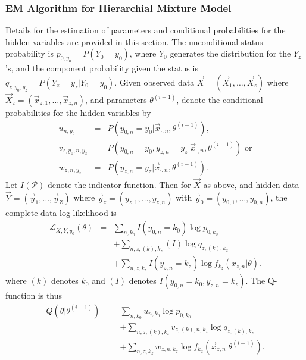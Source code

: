 \documentclass{bmcart}
\begin{document}
\begin{backmatter}
 \subsubsection*{EM Algorithm for Hierarchial Mixture Model}
Details for the estimation of parameters and conditional probabilities for the hidden variables are provided in this section. The unconditional status probability is $p_{0,y_0} = P(Y_0 = y_0)$, where $Y_0$ generates the distribution for the $Y_z$'s, and 
the component probability given the status is $q_{z,y_0,y_z} = P(Y_z = y_z | Y_0 = y_0)$.  Given observed data $\vec X = (\vec 
X_1, \ldots, \vec X_z)$ where $\vec X_z = (\vec x_{z,1}, \ldots, \vec x_{z,n})$, and parameters $\theta^{(i-1)}$, denote the 
conditional probabilities for the hidden variables by
\begin{equation}\label{eqn:weights_mdmixmod_defn}
	\begin{array}{rcl}
		u_{n,y_0} & = & P(y_{0,n} = y_0 | \vec x_{\cdot,n}, \theta^{(i-1)}), \\
		v_{z,y_0,n,y_z} & = & P(y_{0,n} = y_0, y_{z,n} = y_z | \vec x_{\cdot,n}, \theta^{(i-1)}) \text{ or} \\
		w_{z,n,y_z} & = & P(y_{z,n} = y_z | \vec x_{\cdot,n}, \theta^{(i-1)}).
	\end{array}
\end{equation}
 Let $I(\mathcal P)$ denote the indicator function.  Then for $\vec X$ as above, and hidden data $\vec Y = (\vec y_1, \ldots, \vec 
 y_Z)$ where $\vec y_z = (y_{z,1}, \ldots, y_{z,n})$ with $\vec y_0 = (y_{0,1}, \ldots, y_{0,n})$, the complete data log-likelihood is
\begin{equation}\label{eqn:mdmixmod_llik}
	\begin{array}{rcl}
		\mathcal L_{X, Y, y_0}(\theta) & = & \sum_{n, k_0} I(y_{0,n}=k_0) \log p_{0,k_0} \\
		& & + \sum_{n, z, (k) ,k_z} (I) \log q_{z,(k),k_z} \\
		& & + \sum_{n, z, k_z} I(y_{z,n}=k_z) \log f_{k_z}(x_{z,n} | \theta).
	\end{array}
\end{equation}
where $(k)$ denotes $k_0$ and $(I)$ denotes $I(y_{0,n}=k_0,y_{z,n}=k_z)$.  The Q-function is thus
\begin{equation}\label{eqn:mdmixmod_qfun}
	\begin{array}{rcl}
		 Q(\theta|\theta^{(i-1)}) & = & \sum_{n,k_0} u_{n,k_0} \log p_{0,k_0} \\
		& & + \sum_{n,z,(k),k_z} v_{z,(k),n,k_z} \log q_{z,(k),k_z} \\
		& & + \sum_{n,z,k_z} w_{z,n,k_z} \log f_{k_z}(\vec x_{z,n} | \theta^{(i-1)}).
	\end{array}
\end{equation}


\end{backmatter}
\end{document}
